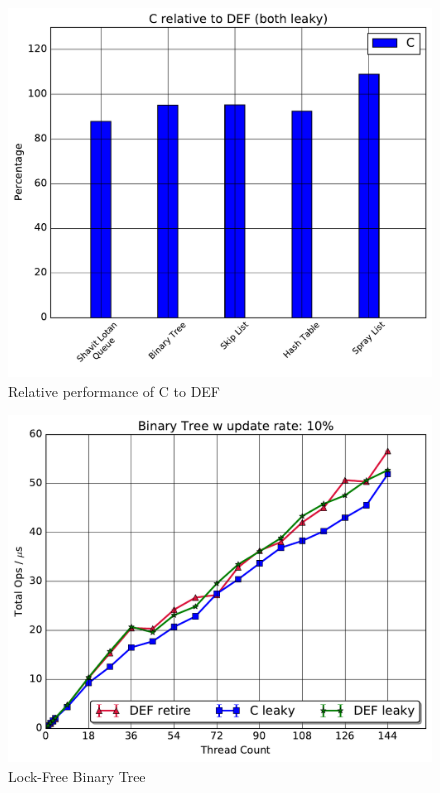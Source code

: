 \begin{figure}
\includegraphics[scale=0.4]{gfx/relativeperf.pdf}
\caption{Relative performance of C to DEF}
\label{fig:relativeperf}
\end{figure}
\begin{figure}
\includegraphics[scale=.4]{gfx/BinaryTreeLight.pdf}
\caption{Lock-Free Binary Tree}
\label{fig:bintreelight}
\end{figure}

